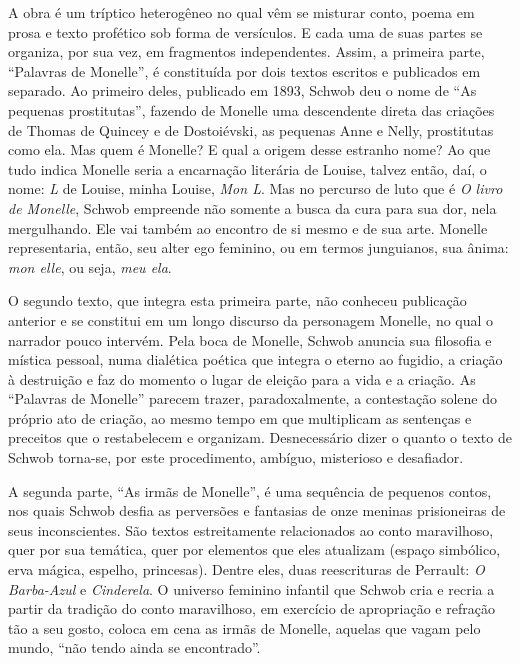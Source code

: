 A obra é um tríptico heterogêneo no qual vêm se misturar conto, poema em
prosa e texto profético sob forma de versículos. E cada uma de suas partes se
organiza, por sua vez, em fragmentos independentes. Assim, a primeira parte,
``Palavras de Monelle'', é constituída por dois textos escritos e
publicados em separado. Ao primeiro deles, publicado em 1893, Schwob deu o nome
de ``As pequenas prostitutas'', fazendo de Monelle uma descendente direta
das criações de Thomas de Quincey e de Dostoiévski, as pequenas Anne e Nelly,
prostitutas como ela. Mas quem é Monelle? E qual a origem desse estranho nome?
Ao que tudo indica Monelle seria a encarnação literária de Louise, talvez então, daí,
o nome: \textit{L} de Louise, minha Louise, \textit{Mon L}. Mas no percurso de luto
que é \textit{O livro de Monelle}, Schwob empreende não somente a busca da cura para
sua dor, nela mergulhando. Ele vai também ao encontro de si mesmo e de sua arte.
Monelle representaria, então, seu alter ego feminino, ou em termos junguianos,
sua ânima: \textit{mon elle}, ou seja, \textit{meu ela}.

O segundo texto, que integra esta primeira parte, não conheceu publicação
anterior e se constitui em um longo discurso da personagem Monelle, no qual o
narrador pouco intervém. Pela boca de Monelle, Schwob anuncia sua filosofia e
mística pessoal, numa dialética poética que integra o eterno ao fugidio, a
criação à destruição e faz do momento o lugar de eleição para a vida e a
criação. As ``Palavras de Monelle'' parecem trazer, paradoxalmente, a
contestação solene do próprio ato de criação, ao mesmo tempo em que multiplicam
as sentenças e preceitos que o restabelecem e organizam. Desnecessário dizer o
quanto o texto de Schwob torna-se, por este procedimento, ambíguo, misterioso e
desafiador.

A segunda parte, ``As irmãs de Monelle'', é uma sequência de pequenos
contos, nos quais Schwob desfia as perversões e fantasias de onze meninas
prisioneiras de seus inconscientes. São textos estreitamente relacionados ao
conto maravilhoso, quer por sua temática, quer por elementos que eles atualizam
(espaço simbólico, erva mágica, espelho, princesas). Dentre eles, duas
reescrituras de Perrault: \textit{O Barba-Azul} e \textit{Cinderela}. O
universo feminino infantil que Schwob cria e recria a partir da tradição do
conto maravilhoso, em exercício de apropriação e refração tão a seu gosto,
coloca em cena as irmãs de Monelle, aquelas que vagam pelo mundo, “não tendo
ainda se encontrado”. 

